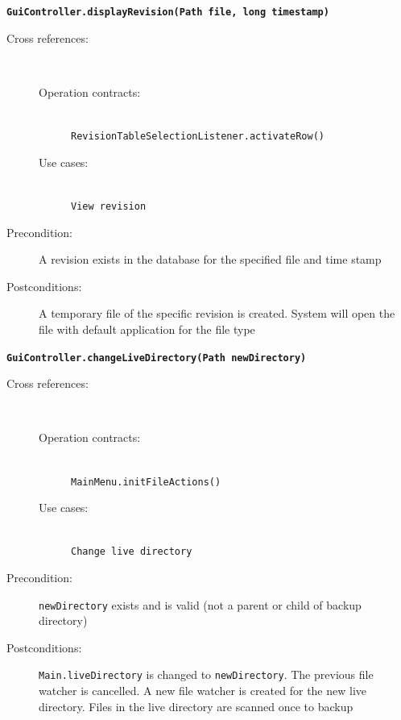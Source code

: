 \documentclass[12pt,a4paper]{article}
\begin{document}
\textbf{\texttt{GuiController.displayRevision(Path file, long timestamp)}}
\begin{description}
	\item[Cross references:] \hfill \vspace{-4ex}  \\
	\begin{description} 
		\item[Operation contracts:] \hfill \\
			\texttt{RevisionTableSelectionListener.activateRow()}
		\item[Use cases:] \hfill \\
			\texttt{View revision}
	\end{description}	
	\item[Precondition:] A revision exists in the database for the specified file and time stamp
	\item[Postconditions:] A temporary file of the specific revision is created. System will open the file with default application for the file type
\end{description}

\vspace{0.75cm}

\textbf{\texttt{GuiController.changeLiveDirectory(Path newDirectory)}}
\begin{description}
	\item[Cross references:] \hfill \vspace{-4ex}  \\
		\begin{description} 
		\item[Operation contracts:] \hfill \\
			\texttt{MainMenu.initFileActions()}
		\item[Use cases:] \hfill \\
			\texttt{Change live directory}
	\end{description}	
	\item[Precondition:] \texttt{newDirectory} exists and is valid (not a parent or child of backup directory)
	\item[Postconditions:] \texttt{Main.liveDirectory} is changed to \texttt{newDirectory}. The previous file watcher is cancelled. A new file watcher is created for the new live directory. Files in the live directory are scanned once to backup
\end{description}

\vspace{0.75cm}
\end{document}
